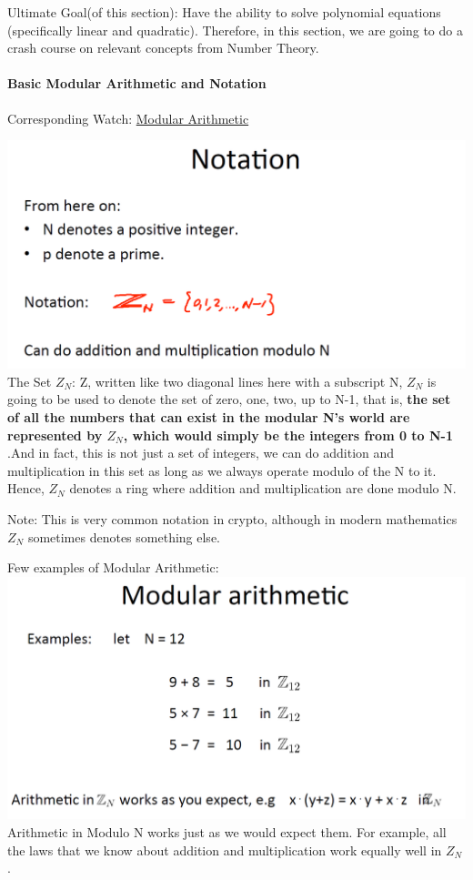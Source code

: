 \documentclass[11pt]{article}
\makeatletter
\def\maxwidth{\ifdim\Gin@nat@width>\linewidth\linewidth
    \else\Gin@nat@width\fi}
\let\Oldincludegraphics\includegraphics
\renewcommand{\includegraphics}[1]{\Oldincludegraphics[width=.8\maxwidth]{#1}}
\makeatother
\begin{document}
Ultimate Goal(of this section): Have the ability to solve polynomial
equations (specifically linear and quadratic). Therefore, in this
section, we are going to do a crash course on relevant concepts from
Number Theory.

\hypertarget{basic-modular-arithmetic-and-notation}{%
\paragraph{Basic Modular Arithmetic and
Notation}\label{basic-modular-arithmetic-and-notation}}

Corresponding Watch:
\href{https://www.coursera.org/learn/crypto/lecture/2YWK8/notation}{Modular
Arithmetic}

\includegraphics{./Images/NT-Notation.png} The Set \(Z_{N}\): Z, written
like two diagonal lines here with a subscript N, \(Z_{N}\) is going to
be used to denote the set of zero, one, two, up to N-1, that is,
\textbf{the set of all the numbers that can exist in the modular N's
world are represented by \(Z_{N}\), which would simply be the integers
from 0 to N-1} .And in fact, this is not just a set of integers, we can
do addition and multiplication in this set as long as we always operate
modulo of the N to it. Hence, \(Z_{N}\) denotes a ring where addition
and multiplication are done modulo N.

Note: This is very common notation in crypto, although in modern
mathematics \(Z_{N}\) sometimes denotes something else.

Few examples of Modular Arithmetic:
\includegraphics{./Images/NT-ModArith-Ex.png} Arithmetic in Modulo N
works just as we would expect them. For example, all the laws that we
know about addition and multiplication work equally well in \(Z_{N}\).
\end{document}
